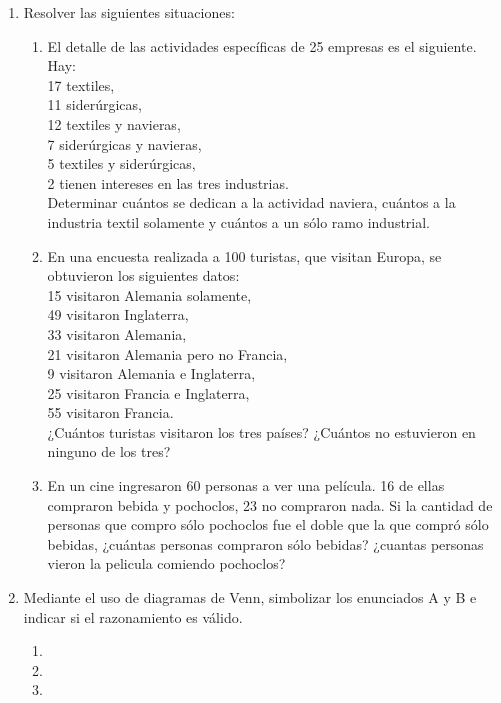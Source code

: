 \documentclass[a4paper]{article}
\newcommand{\exercise}{\item}
\begin{document}
\begin{enumerate}
	\exercise Resolver las siguientes situaciones:
	\begin{enumerate} [label=(\alph*)]
		\item El detalle de las actividades específicas de 25 empresas es el siguiente. Hay: \\ 17 textiles, \\ 11 siderúrgicas, \\ 12 textiles y navieras, \\ 7 siderúrgicas y navieras, \\ 5 textiles y siderúrgicas, \\ 2 tienen intereses en las tres industrias. \\ Determinar cuántos se dedican a la actividad naviera, cuántos a la industria textil solamente y cuántos a un sólo ramo industrial. 

		\item En una encuesta realizada a 100 turistas, que visitan Europa, se obtuvieron los siguientes datos: \\ 15 visitaron Alemania solamente, \\ 49 visitaron Inglaterra, \\ 33 visitaron Alemania, \\ 21 visitaron Alemania pero no Francia, \\ 9 visitaron Alemania e Inglaterra, \\25 visitaron Francia e Inglaterra, \\	55 visitaron Francia. \\ ¿Cuántos turistas visitaron los tres países? ¿Cuántos no estuvieron en ninguno de los tres?

		\item En un cine ingresaron 60 personas a ver una película. 16 de ellas compraron bebida y pochoclos, 23 no compraron nada. Si la cantidad de personas que compro sólo pochoclos fue el doble que la que compró sólo bebidas, ¿cuántas personas compraron sólo bebidas? ¿cuantas personas vieron la pelicula comiendo pochoclos?
	
	\end{enumerate}


	\exercise Mediante el uso de diagramas de Venn, simbolizar los enunciados A y B e indicar si el razonamiento es válido.
	\begin{enumerate} [label=(\alph*)]
		\item {}
		\item {}
		\item {}


\end{enumerate}
\end{enumerate}
\end{document}
